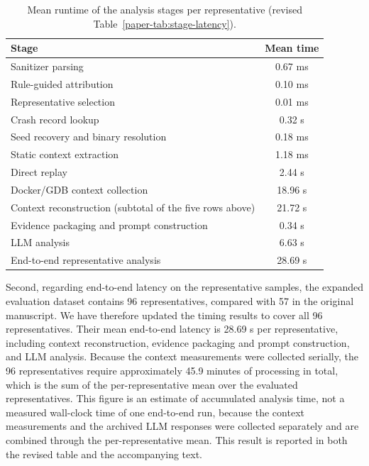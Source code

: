 \documentclass[onecolumn,11pt]{article}
\begin{document}
\begin{table}[!ht]
\centering
\small
\caption{Mean runtime of the analysis stages per representative (revised Table~\ref{paper-tab:stage-latency}).}
\label{tab:stage-latency-response}
\begin{tabular*}{\linewidth}{@{\extracolsep{\fill}}>{\color{blue}}l>{\color{blue}}c}
\toprule
Stage & Mean time \\
\midrule
Sanitizer parsing & 0.67 ms \\
Rule-guided attribution & 0.10 ms \\
Representative selection & 0.01 ms \\
\quad Crash record lookup & 0.32 s \\
\quad Seed recovery and binary resolution & 0.18 ms \\
\quad Static context extraction & 1.18 ms \\
\quad Direct replay & 2.44 s \\
\quad Docker/GDB context collection & 18.96 s \\
Context reconstruction (subtotal of the five rows above) & 21.72 s \\
Evidence packaging and prompt construction & 0.34 s \\
LLM analysis & 6.63 s \\
End-to-end representative analysis & 28.69 s \\
\bottomrule
\end{tabular*}
\end{table}

Second, regarding end-to-end latency on the representative samples, the expanded evaluation dataset contains 96 representatives, compared with 57 in the original manuscript. We have therefore updated the timing results to cover all 96 representatives. Their mean end-to-end latency is 28.69 s per representative, including context reconstruction, evidence packaging and prompt construction, and LLM analysis. Because the context measurements were collected serially, the 96 representatives require approximately 45.9 minutes of processing in total, which is the sum of the per-representative mean over the evaluated representatives. This figure is an estimate of accumulated analysis time, not a measured wall-clock time of one end-to-end run, because the context measurements and the archived LLM responses were collected separately and are combined through the per-representative mean. This result is reported in both the revised table and the accompanying text.
\end{document}

